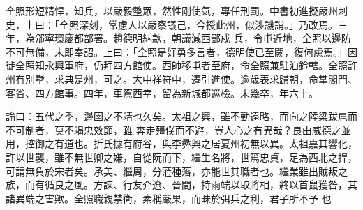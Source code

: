 \begin{pinyinscope}
 全照形短精悍，知兵，以嚴毅整眾，然性剛使氣，專任刑罰。中書初進擬嚴州刺史，上曰：「全照深刻，常慮人以嚴察議己，今授此州，似涉譏誚。」乃改焉。三年，為邠寧環慶都部署。趙德明納款，朝議減西鄙戍
 兵，令屯近地，全照以邊防不可無備，未即奉詔。上曰：「全照是好勇多言者，德明使已至闕，復何慮焉。」因徙全照知永興軍府，仍拜四方館使。西師移屯者至府，命全照兼駐泊鈐轄。全照許州有別墅，求典是州，可之。大中祥符中，遷引進使。逾歲表求歸朝，命掌閣門、客省、四方館事。四年，車駕西幸，留為新城都巡檢。未幾卒，年六十。



 論曰：五代之季，邊圉之不靖也久矣。太祖之興，雖不勤遠略，而向之陸梁跋扈而不可制者，莫不竭忠效節，雖
 奔走殭僕而不避，豈人心之有異哉？良由威德之並用，控御之有道也。折氏據有府谷，與李彞興之居夏州初無以異。太祖嘉其響化，許以世襲，雖不無世卿之嫌，自從阮而下，繼生名將，世篤忠貞，足為西北之捍，可謂無負於宋者矣。承美、繼周，分蒞種落，亦能世其職者也。繼業雖出賊叛之族，而有循良之風。方諫、行友介遼、晉間，持雨端以取將相，終以首鼠獲咎，其諸異端之害歟。全照職親禁衛，素稱嚴果，而昧於弭兵之利，君子所不予
 也



\end{pinyinscope}